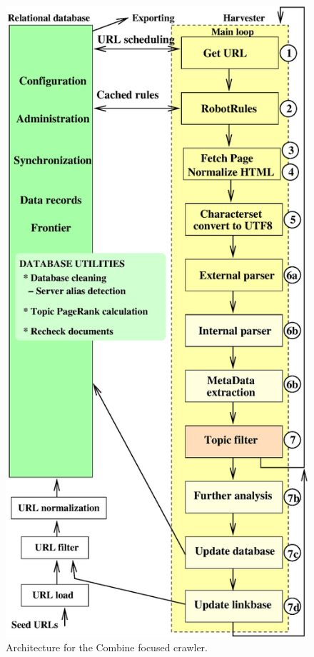 \begin{figure}[htb]
\begin{center}
 \includegraphics[height=0.6\textheight]{CrawlerArchitecture.xfig.eps}
\end{center}
\caption{Architecture for the Combine focused crawler.}
\label{combinearch}
\end{figure}

